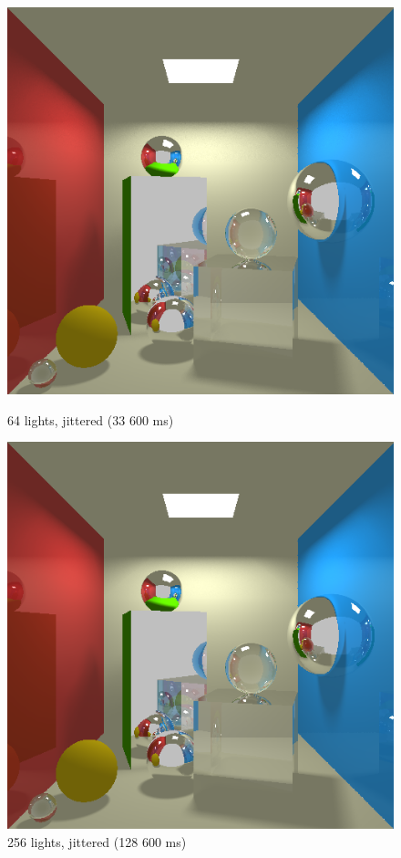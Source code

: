 \begin{figure}[H]
    \includegraphics[width=\linewidth]{img/shadows/64_jittered.png}
    \caption{64 lights, jittered (33 600 ms)}
\endminipage\hfill
{}
    \centering
    \includegraphics[width=\linewidth]{img/shadows/256_jittered.png}
    \caption{256 lights, jittered (128 600 ms)}
\endminipage\hfill
\end{figure}

